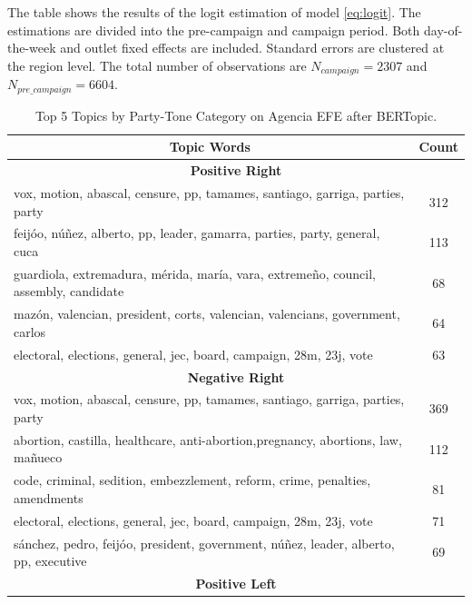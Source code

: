 \documentclass[12pt]{article}
\begin{document}
\begin{table}[!htb]
\begin{threeparttable}
				\begin{tablenotes}
				\small
				\item \footnotesize{The table shows the results of the logit estimation of model \ref{eq:logit}. The estimations are divided into the pre-campaign and campaign period. Both day-of-the-week and outlet fixed effects are included. Standard errors are clustered at the region level. The total number of observations are $N_{campaign}=2307$ and  $N_{pre\_campaign}=6604$.}
			\end{tablenotes}
		\end{threeparttable}
	\end{table}
	
	
	
\begin{table}[!htb]
	\centering
	\caption{Top 5 Topics by Party-Tone Category on Agencia EFE after BERTopic. }
	\begin{tabular}{|l|c|}
		\hline
				\multicolumn{1}{|c|}{\textbf{Topic Words}}& \textbf{Count} \\
		\hline
		\hline
		\multicolumn{2}{|c|}{\textbf{Positive Right}} \\
		\hline
		vox, motion, abascal, censure, pp, tamames, santiago, garriga, parties, party & 312 \\
		feijóo, núñez, alberto, pp, leader, gamarra, parties, party, general, cuca & 113 \\
		guardiola, extremadura, mérida, maría, vara, extremeño, council, assembly, candidate & 68 \\
		mazón, valencian, president, corts, valencian, valencians, government, carlos & 64 \\
		electoral, elections, general, jec, board, campaign, 28m, 23j, vote & 63 \\
		\hline
		\multicolumn{2}{|c|}{\textbf{Negative Right}} \\
		\hline
		vox, motion, abascal, censure, pp, tamames, santiago, garriga, parties, party & 369 \\
		abortion, castilla, healthcare, anti-abortion,pregnancy, abortions, law, mañueco & 112 \\
		code, criminal, sedition, embezzlement, reform, crime, penalties, amendments & 81 \\
		electoral, elections, general, jec, board, campaign, 28m, 23j, vote & 71 \\
		sánchez, pedro, feijóo, president, government, núñez, leader, alberto, pp, executive & 69 \\
		\hline
		\multicolumn{2}{|c|}{\textbf{Positive Left}} \\

\end{tabular}
\end{table}
\end{document}
